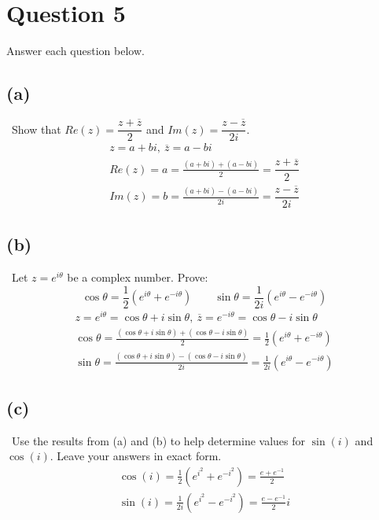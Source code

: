 \documentclass[12pt]{article}
\begin{document}
\section{Question 5}
Answer each question below.

\vspace{0.3em}
\subsection{(a)} \, Show that $Re(z)=\dfrac{z+\overline{z}}{2}$ and $Im(z)=\dfrac{z-\overline{z}}{2i}$.
\begin{gather*}
    z=a+bi,\  \overline{z}=a-bi\\
    Re(z)=a=\frac{(a+bi)+(a-bi)}{2}=\dfrac{z+\overline{z}}{2}\\
    Im(z)=b=\frac{(a+bi)-(a-bi)}{2i}=\dfrac{z-\overline{z}}{2i}
\end{gather*}

\subsection{(b)} \, Let $z=e^{i \theta}$ be a complex number. Prove:
\[
\cos \theta =\frac{1}{2}(e^{i \theta}+e^{-i \theta}) \quad \quad \sin\theta =\frac{1}{2i}(e^{i \theta}-e^{-i \theta})
\]
\begin{gather*}
    z=e^{i \theta}=\cos \theta + i\sin \theta, \ \overline{z}=e^{-i \theta}=\cos \theta - i \sin \theta\\
    \cos \theta = \frac{(\cos \theta + i\sin \theta)+(\cos \theta - i \sin \theta)}{2}=\frac{1}{2}(e^{i \theta}+e^{-i \theta})\\
    \sin \theta = \frac{(\cos \theta + i\sin \theta)-(\cos \theta - i \sin \theta)}{2i} = \frac{1}{2i}(e^{i \theta}-e^{-i \theta})
\end{gather*}

\subsection{(c)} \, Use the results from (a) and (b) to help determine values for $\sin (i)$ and $\cos (i)$. Leave your answers in exact form. 
\begin{gather*}
    \cos (i)=\frac{1}{2}(e^{i^2}+e^{-i^2})=\boxed{\frac{e+e^{-1}}{2}}\\
    \sin (i)=\frac{1}{2i}(e^{i^2}-e^{-i^2})=\boxed{\frac{e-e^{-1}}{2}i}
\end{gather*}
\end{document}

